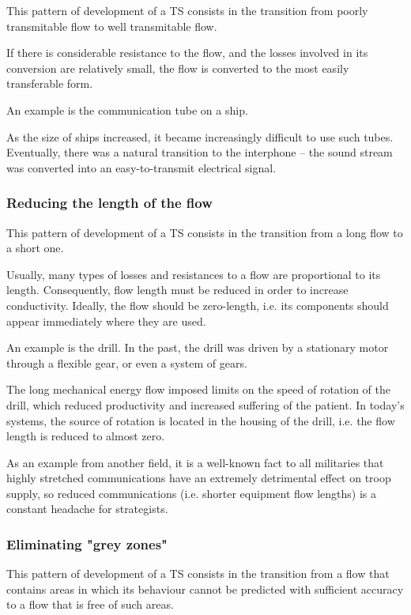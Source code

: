 \documentclass[a4paper,11pt]{article}
\begin{document}
This pattern of development of a TS consists in the transition from poorly
transmitable flow to well transmitable flow.

If there is considerable resistance to the flow, and the losses involved in
its conversion are relatively small, the flow is converted to the most easily
transferable form.

An example is the communication tube on a ship.

As the size of ships increased, it became increasingly difficult to use such
tubes. Eventually, there was a natural transition to the interphone -- the
sound stream was converted into an easy-to-transmit electrical signal.

\subsubsection{Reducing the length of the flow}

This pattern of development of a TS consists in the transition from a long flow
to a short one.

Usually, many types of losses and resistances to a flow are proportional to
its length. Consequently, flow length must be reduced in order to increase
conductivity. Ideally, the flow should be zero-length, i.e. its components
should appear immediately where they are used.

An example is the drill. In the past, the drill was driven by a stationary
motor through a flexible gear, or even a system of gears.

The long mechanical energy flow imposed limits on the speed of rotation of the
drill, which reduced productivity and increased suffering of the patient. In
today's systems, the source of rotation is located in the housing of the
drill, i.e. the flow length is reduced to almost zero.

As an example from another field, it is a well-known fact to all militaries
that highly stretched communications have an extremely detrimental effect on
troop supply, so reduced communications (i.e. shorter equipment flow lengths)
is a constant headache for strategists.

\subsubsection{Eliminating "grey zones"}

This pattern of development of a TS consists in the transition from a flow
that contains areas in which its behaviour cannot be predicted with sufficient
accuracy to a flow that is free of such areas.
\end{document}
